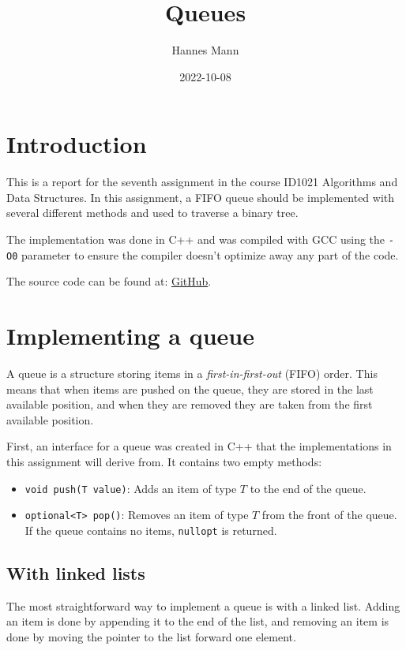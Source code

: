 \documentclass[a4paper,11pt]{article}
\begin{document}
\title{
    \textbf{Queues}
}
\author{Hannes Mann}
\date{2022-10-08}

\maketitle

\section*{Introduction}

This is a report for the seventh assignment in the course ID1021 Algorithms and Data Structures.
In this assignment, a FIFO queue should be implemented with several different methods and used to traverse a binary tree.

The implementation was done in C++ and was compiled with GCC using the {\tt -O0} parameter to ensure the compiler doesn't optimize away any part of the code.

The source code can be found at: \href{https://github.com/HannesMann/ID1021/tree/main/src/queue}{GitHub}.

\section*{Implementing a queue}

A queue is a structure storing items in a \emph{first-in-first-out} (FIFO) order.
This means that when items are pushed on the queue, they are stored in the last available position, and when they are removed they are taken from the first available position.

First, an interface for a queue was created in C++ that the implementations in this assignment will derive from. It contains two empty methods:
\begin{itemize}
	\item \texttt{void push(T value)}: Adds an item of type $T$ to the end of the queue.
	\item \texttt{optional<T> pop()}: Removes an item of type $T$ from the front of the queue. If the queue contains no items, \texttt{nullopt} is returned.
\end{itemize}

\subsection*{With linked lists}

The most straightforward way to implement a queue is with a linked list.
Adding an item is done by appending it to the end of the list, and removing an item is done by moving the pointer to the list forward one element.
\end{document}
